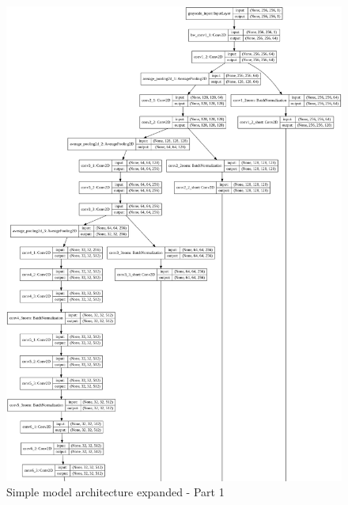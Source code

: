 \documentclass[12pt,openright,oneside,a4paper,english]{abntex2}
\begin{document}
\begin{otherlanguage}{english}
\begin{figure}[!htb]
\centering
\includegraphics[height=\textheight]{model_plot/Simple1}
\caption{Simple model architecture expanded - Part 1}
\label{simple_plot_1}
\end{figure}


\end{otherlanguage}
\end{document}
